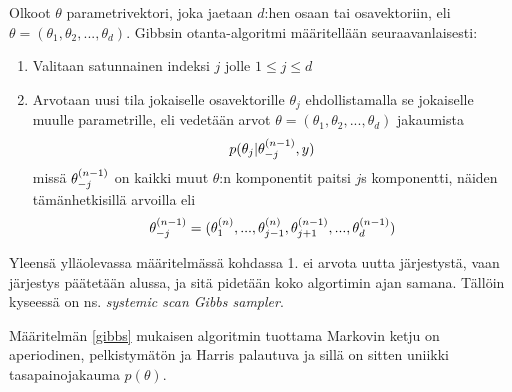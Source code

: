 \begin{maar}\label{gibbs}
	Olkoot $\theta$ parametrivektori, joka jaetaan $d$:hen osaan tai osavektoriin, eli $\theta = (\theta_1, \theta_2,...,\theta_d)$. Gibbsin otanta-algoritmi määritellään seuraavanlaisesti:
	\begin{enumerate}
		\item Valitaan satunnainen indeksi $j$ jolle $1 \leq j \leq d$
		\item Arvotaan uusi tila jokaiselle osavektorille $\theta_j$ ehdollistamalla se jokaiselle muulle parametrille, eli vedetään arvot $\theta = (\theta_1, \theta_2,...,\theta_d)$ jakaumista
		\begin{equation}
			p(\theta_j|\theta^{(n-1)}_{-j},y)
		\end{equation}
		missä $\theta^{(n-1)}_{-j}$ on kaikki muut $\theta$:n komponentit paitsi $j$s komponentti, näiden tämänhetkisillä arvoilla eli 
		\begin{equation*}
			\theta^{(n-1)}_{-j} = (\theta^{(n)}_{1},...,\theta^{(n)}_{j-1},\theta^{(n-1)}_{j+1},...,\theta^{(n-1)}_{d})
		\end{equation*}
	\end{enumerate}
\end{maar}

Yleensä ylläolevassa määritelmässä kohdassa 1. ei arvota uutta järjestystä, vaan järjestys päätetään alussa, ja sitä pidetään koko algortimin ajan samana. Tällöin kyseessä on ns. \textit{systemic scan Gibbs sampler}.

\begin{lause}
	Määritelmän \ref{gibbs} mukaisen algoritmin tuottama Markovin ketju on aperiodinen, pelkistymätön ja Harris palautuva ja sillä on sitten uniikki tasapainojakauma $p(\theta)$. \cite{koistinen_computational_2009}
\end{lause}

